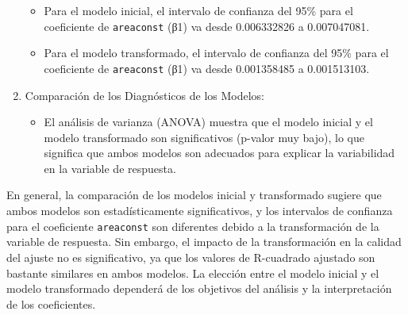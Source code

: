 \documentclass[
]{article}
\providecommand{\tightlist}{%
  \setlength{\itemsep}{0pt}\setlength{\parskip}{0pt}}
\begin{document}
\begin{enumerate}
  \begin{itemize}
  \tightlist
  \item
    Para el modelo inicial, el intervalo de confianza del 95\% para el
    coeficiente de \texttt{areaconst} (β1) va desde 0.006332826 a
    0.007047081.
  \item
    Para el modelo transformado, el intervalo de confianza del 95\% para
    el coeficiente de \texttt{areaconst} (β1) va desde 0.001358485 a
    0.001513103.
  \end{itemize}
\item
  Comparación de los Diagnósticos de los Modelos:

  \begin{itemize}
  \tightlist
  \item
    El análisis de varianza (ANOVA) muestra que el modelo inicial y el
    modelo transformado son significativos (p-valor muy bajo), lo que
    significa que ambos modelos son adecuados para explicar la
    variabilidad en la variable de respuesta.
  \end{itemize}
\end{enumerate}

En general, la comparación de los modelos inicial y transformado sugiere
que ambos modelos son estadísticamente significativos, y los intervalos
de confianza para el coeficiente \texttt{areaconst} son diferentes
debido a la transformación de la variable de respuesta. Sin embargo, el
impacto de la transformación en la calidad del ajuste no es
significativo, ya que los valores de R-cuadrado ajustado son bastante
similares en ambos modelos. La elección entre el modelo inicial y el
modelo transformado dependerá de los objetivos del análisis y la
interpretación de los coeficientes.
\end{document}
